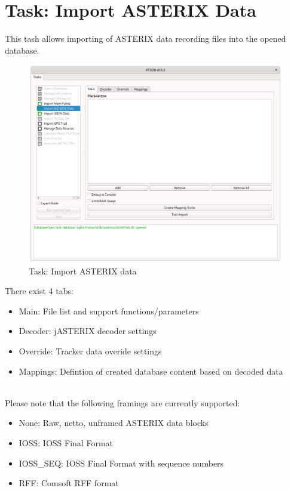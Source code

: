 \section{Task: Import ASTERIX Data}
\label{sec:task_import_asterix}

This tash allows importing of ASTERIX data recording files into the opened database. \\

\begin{figure}[H]
  \hspace*{-2.5cm}
    \includegraphics[width=19cm]{figures/asterix_import_data.png}
  \caption{Task: Import ASTERIX data}
\end{figure}

There exist 4 tabs:

\begin{itemize}  
\item Main: File list and support functions/parameters
\item Decoder: jASTERIX decoder settings
\item Override: Tracker data overide settings
\item Mappings: Defintion of created database content based on decoded data
\end{itemize}
\ \\

Please note that the following framings are currently supported:
\begin{itemize}  
\item None: Raw, netto, unframed ASTERIX data blocks
\item IOSS: IOSS Final Format
\item IOSS\_SEQ: IOSS Final Format with sequence numbers
\item RFF: Comsoft RFF format
\end{itemize}
\ \\

